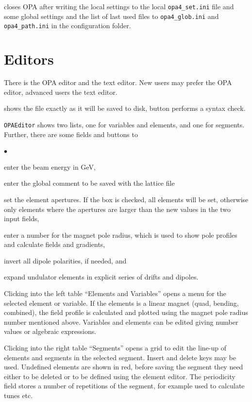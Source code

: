 \documentclass[12pt]{article}
\newenvironment{mylist}
  {\begin{list}{$\bullet$}{\parsep 0pt}}
  {\end{list}}
\newcommand\button[1]{\fbox{\small\bf #1}}
\newcommand\chkbox[1]{\fbox{\small $\circ\,$#1}}
\begin{document}
\button{Exit} closes OPA after writing the local settings to the local {\tt opa4\_set.ini} file and some global settings and the list of last used files to {\tt opa4\_glob.ini} and {\tt opa4\_path.ini} in the configuration folder.


\section{Editors}

There is the OPA editor and the text editor.
New users may prefer the OPA editor, advanced users the text editor.

\button{TextEditor} shows the file exactly as it will be saved to disk,
\button{Test} button performs a syntax check. 

{\tt OPAEditor} shows two lists, one for variables and elements, and one for segments. 
Further, there are some fields and buttons to
\begin{mylist}
\item enter the beam energy in GeV,
\item enter the global comment to be saved with the lattice file
\item set the element apertures. If the box \chkbox{set all} is checked, all elements will be set, otherwise only elements where the apertures are larger than the new values in the two input fields,
\item enter a number for the magnet pole radius, which is used to show pole profiles and calculate fields and gradients,
\item invert all dipole polarities, if needed, and
\item expand undulator elements in explicit series of drifts and dipoles.
\end{mylist}

Clicking into the left table ``Elements and Variables'' opens a menu for the selected element or variable. If the elements is a linear magnet (quad, bending, combined), the field profile is calculated and plotted using the magnet pole radius number mentioned above. Variables and elements can be edited giving number values or algebraic expressions.

Clicking into the right table ``Segments'' opens a grid to edit the line-up of elements and segments in the selected segment. Insert and delete keys may be used. Undefined elements are shown in red, before
saving the segment they need either to be deleted or to be defined using the element editor. The periodicity field stores a number of repetitions of the segment, for example used to calculate tunes etc.
\end{document}
